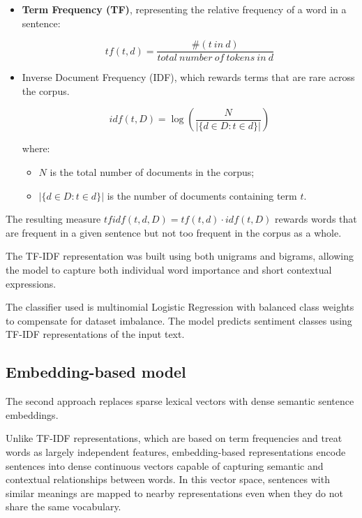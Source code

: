 \documentclass[11pt]{article}
\begin{document}
    \begin{itemize}
        \item \textbf{Term Frequency (TF)}, representing the relative frequency of a word in a sentence:
        
        \[
        tf(t,d) = \frac{\#(t\ in\ d)}{total\ number\ of\ tokens\ in\ d}
        \]

        \item Inverse Document Frequency (IDF), which rewards terms that are rare across the corpus.
        
        \[
        idf(t,D) = \log \left( \frac{N}{|\{ d \in D : t \in d \}|} \right)
        \]

        where:
        \begin{itemize}
            \item \(N\) is the total number of documents in the corpus;
            \item \(|\{ d \in D : t \in d \}|\) is the number of documents containing term \(t\).
        \end{itemize}

    \end{itemize}

    The resulting measure \( tfidf(t,d,D) = tf(t,d) \cdot idf(t,D) \) rewards words that are frequent in a given sentence but not too frequent in the corpus as a whole.
    
    The TF-IDF representation was built using both unigrams and bigrams, allowing the model to capture both individual word importance and short contextual expressions.

    The classifier used is multinomial Logistic Regression with balanced class weights to compensate for dataset imbalance. The model predicts sentiment classes using TF-IDF representations of the input text.


    \subsection{Embedding-based model}

    The second approach replaces sparse lexical vectors with dense semantic sentence embeddings.

    Unlike TF-IDF representations, which are based on term frequencies and treat words as largely independent features, embedding-based representations encode sentences into dense continuous vectors capable of capturing semantic and contextual relationships between words. In this vector space, sentences with similar meanings are mapped to nearby representations even when they do not share the same vocabulary.
\end{document}

